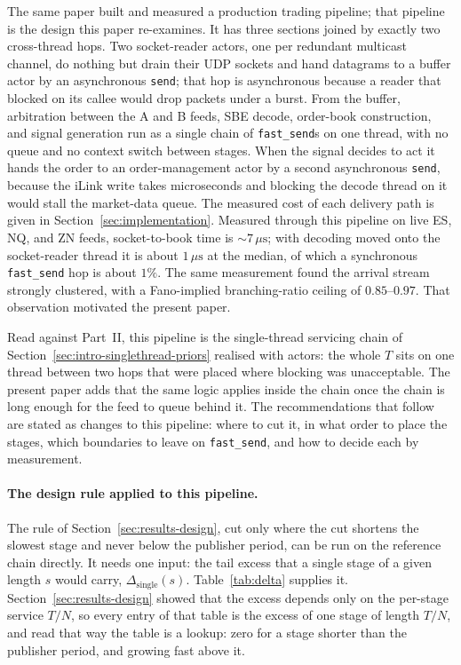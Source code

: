 \documentclass[11pt]{article}
\begin{document}
The same paper built and measured a production trading pipeline; that pipeline is the design this paper re-examines. It has three
sections joined by exactly two cross-thread hops. Two socket-reader actors, one per
redundant multicast channel, do nothing but drain their UDP sockets and hand datagrams to
a buffer actor by an asynchronous \texttt{send}; that hop is asynchronous because a reader
that blocked on its callee would drop packets under a burst. From the buffer, arbitration
between the A and B feeds, SBE decode, order-book construction, and signal generation run
as a single chain of \texttt{fast\_send}s on one thread, with no queue and no context
switch between stages. When the signal decides to act it hands the order to an
order-management actor by a second asynchronous \texttt{send}, because the iLink write
takes microseconds and blocking the decode thread on it would stall the market-data queue.
The measured cost of each delivery path is given in Section~\ref{sec:implementation}.
Measured through this pipeline on live ES, NQ, and ZN feeds, socket-to-book time is
$\sim 7\,\mu\mathrm{s}$; with decoding moved onto the socket-reader thread it is about
$1\,\mu\mathrm{s}$ at the median, of which a synchronous \texttt{fast\_send} hop is about $1\%$.
The same measurement found the arrival stream strongly clustered, with a Fano-implied
branching-ratio ceiling of $0.85$--$0.97$. That
observation motivated the present paper.

Read against Part~II, this pipeline is the single-thread servicing chain of
Section~\ref{sec:intro-singlethread-priors} realised with actors: the whole $T$ sits on
one thread between two hops that were placed where blocking was unacceptable. The present paper adds that the same logic applies inside the chain once the chain is
long enough for the feed to queue behind it. The recommendations that follow are stated as
changes to this pipeline: where to cut it, in what order to place the stages, which
boundaries to leave on \texttt{fast\_send}, and how to decide each by measurement.

\paragraph{The design rule applied to this pipeline.} The rule of
Section~\ref{sec:results-design}, cut only where the cut shortens the slowest stage and
never below the publisher period, can be run on the reference chain directly. It needs one
input: the tail excess that a single stage of a given length $s$ would carry,
$\Delta_{\mathrm{single}}(s)$. Table~\ref{tab:delta} supplies it. Section~\ref{sec:results-design}
showed that the excess depends only on the per-stage service $T/N$, so every entry of that
table is the excess of one stage of length $T/N$, and read that way the table is a lookup:
zero for a stage shorter than the publisher period, and growing fast above it.
\end{document}
